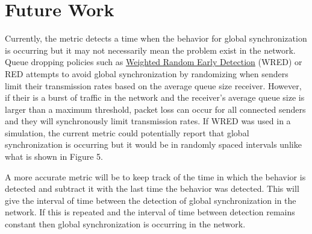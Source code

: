 \documentclass{article}
\begin{document}
\section{Future Work}
Currently, the metric detects a time when the behavior for global synchronization is occurring but it may not necessarily mean the problem exist in the network. Queue dropping policies such as \href{https://en.wikipedia.org/wiki/Weighted_random_early_detection}{Weighted Random Early Detection} (WRED) or RED attempts to avoid global synchronization by randomizing when senders limit their transmission rates based on the average queue size receiver. However, if their is a burst of traffic in the network and the receiver's average queue size is larger than a maximum threshold, packet loss can occur for all connected senders and they will synchronously limit transmission rates. If WRED was used in a simulation, the current metric could potentially report that global synchronization is occurring but it would be in randomly spaced intervals unlike what is shown in Figure 5.

A more accurate metric will be to keep track of the time in which the behavior is detected and subtract it with the last time the behavior was detected. This will give the interval of time between the detection of global synchronization in the network. If this is repeated and the interval of time between detection remains constant then global synchronization is occurring in the network.



\end{document}
